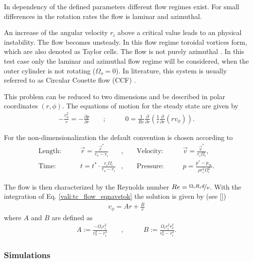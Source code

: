 In dependency of the defined parameters different flow regimes exist.
For small differences in the rotation rates the flow is laminar and azimuthal.

An increase of the angular velocity $r_i$ above a critical value leads to an physical instability. The flow becomes unsteady.
In this flow regime toroidal vortices form, which are also denoted as Taylor cells.
The flow is not purely azimuthal \citep{tritton88}.
In this test case only the laminar and azimuthal flow regime will be considered, when the outer cylinder is not rotating ($\Omega_o = 0$).
In literature, this system is usually referred to as Circular Couette flow (CCF) \citep{Kundu2012}.

This problem can be reduced to two dimensions and be described in polar coordinates $(r, \phi)$. The equations of motion for the steady state are given by \citep{Kundu2012}
\begin{align}
    \label{vali:tc_flow_eqnavstok}
    -\frac{v^2_\phi}{r} = - \frac{\partial p}{\partial r} \qquad ;& \qquad 0 = \frac{1}{Re}\frac{\partial}{\partial r}\left(\frac{1}{r}\frac{\partial}{\partial r}(r v_\phi)\right).
\end{align}


For the non-dimensionalization the default convention is chosen according to  \citep{Chen2015}
\begin{align}
    \text{Length:}\qquad &  \vec{r} = \frac{\vec{r}^*}{r_o - r_i}  &,
    \qquad \text{Velocity:}\qquad& \vec{v} =  \frac{\vec{v}^*}{r_i\Omega_i},\\
    \text{Time:}  \qquad & t = t^* \cdot \frac{r_i \Omega_i}{r_o - r_i}&,
    \qquad  \text{Pressure:}\qquad & p = \frac{p^* - p_\infty}{\rho r_i^2\Omega_i^2}.
\end{align}


The flow is then characterized by the Reynolds number $Re = \nicefrac{\Omega_i R_i d}{\nu}$.
With the integration of Eq. \ref{vali:tc_flow_eqnavstok} the solution is given by (see [\citep{Kundu2012}])
\begin{align}
    v_\phi = Ar + \frac{B}{r}
\end{align}
where $A$ and $B$ are defined as
\begin{align}
    A := \frac{-\Omega_i r_i^2}{r^2_o - r^2_i} \qquad ,& \qquad B := \frac{\Omega_i r^2_i r^2_o}{r^2_o - r^2_i}.
\end{align}

\subsubsection{Simulations}

